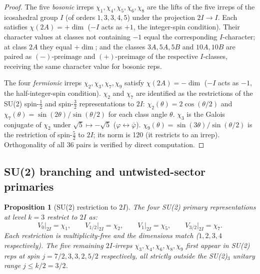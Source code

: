 \documentclass[11pt,a4paper]{article}
\newtheorem{proposition}[theorem]{Proposition}
\theoremstyle{definition}
\theoremstyle{remark}
\newcommand{\vp}{\varphi}
\begin{document}
\begin{proof}
The five \emph{bosonic} irreps $\chi_1,\chi_4,\chi_5,\chi_6,\chi_8$
are the lifts of the five irreps of the icosahedral group $I$ (of orders
$1,3,3,4,5$) under the projection $2I\to I$.  Each satisfies $\chi(2A)=+\dim$
($-I$ acts as $+1$, the integer-spin condition).
Their character values at classes not containing $-1$ equal the
corresponding $I$-character; at class $2A$ they equal $+\dim$;
and the classes $3A,5A,5B$ and $10A,10B$ are paired as
$(-)\text{-preimage}$ and $(+)\text{-preimage}$ of the respective
$I$-classes, receiving the same character value for bosonic reps.

The four \emph{fermionic} irreps $\chi_2,\chi_3,\chi_7,\chi_9$
satisfy $\chi(2A)=-\dim$ ($-I$ acts as $-1$, the half-integer-spin condition).
$\chi_2$ and $\chi_7$ are identified as the restrictions of the SU(2)
spin-$\tfrac{1}{2}$ and spin-$\tfrac{3}{2}$ representations to $2I$:
$\chi_2(\theta) = 2\cos(\theta/2)$ and $\chi_7(\theta)=\sin(2\theta)/\sin(\theta/2)$
for each class angle $\theta$.
$\chi_3$ is the Galois conjugate of $\chi_2$ under $\sqrt{5}\mapsto-\sqrt{5}$
($\vp\leftrightarrow\bar\vp$).
$\chi_9(\theta)=\sin(3\theta)/\sin(\theta/2)$ is the restriction of spin-$\tfrac{5}{2}$
to $2I$; its norm is 120 (it restricts to an irrep).
Orthogonality of all 36 pairs is verified by direct computation.
\end{proof}

\subsection{SU(2) branching and untwisted-sector primaries}

\begin{proposition}[SU(2) restriction to $2I$]
\label{P5:prop:su2_branching}
The four SU(2) primary representations at level $k=3$ restrict to $2I$ as:
\begin{equation}
  V_0\big|_{2I} = \chi_1, \qquad
  V_{1/2}\big|_{2I} = \chi_2, \qquad
  V_1\big|_{2I} = \chi_5, \qquad
  V_{3/2}\big|_{2I} = \chi_7.
  \label{P5:eq:su2_branching}
\end{equation}
Each restriction is multiplicity-free and the dimensions match
($1, 2, 3, 4$ respectively).
The five remaining $2I$-irreps $\chi_3,\chi_4,\chi_6,\chi_8,\chi_9$
first appear in SU(2) reps at spin $j = 7/2, 3, 3, 2, 5/2$ respectively,
all strictly outside the SU(2)$_3$ unitary range $j \leq k/2 = 3/2$.
\end{proposition}
\end{document}
